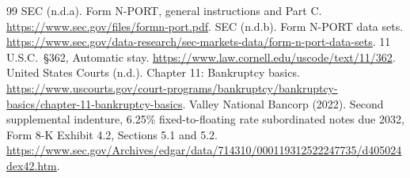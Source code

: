 \documentclass[11pt]{article}
\begin{document}
\begin{thebibliography}{99}
SEC (n.d.a). Form N-PORT, general instructions and Part C. \url{https://www.sec.gov/files/formn-port.pdf}.
SEC (n.d.b). Form N-PORT data sets.
\url{https://www.sec.gov/data-research/sec-markets-data/form-n-port-data-sets}.
11 U.S.C.~\S362, Automatic stay. \url{https://www.law.cornell.edu/uscode/text/11/362}.
United States Courts (n.d.). Chapter 11: Bankruptcy basics.
\url{https://www.uscourts.gov/court-programs/bankruptcy/bankruptcy-basics/chapter-11-bankruptcy-basics}.
Valley National Bancorp (2022). Second supplemental indenture, 6.25\% fixed-to-floating rate subordinated
notes due 2032, Form 8-K Exhibit 4.2, Sections 5.1 and 5.2.
\url{https://www.sec.gov/Archives/edgar/data/714310/000119312522247735/d405024dex42.htm}.
\end{thebibliography}
\end{document}
